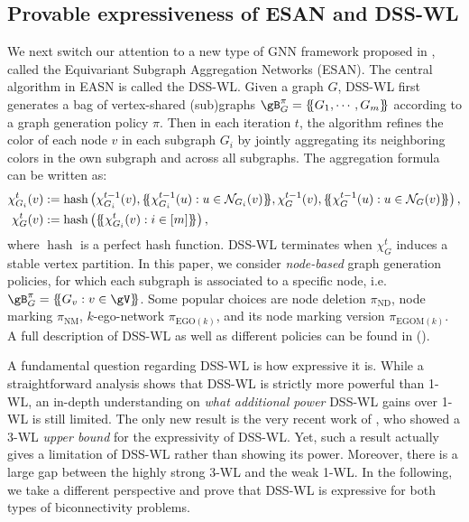 \documentclass{article}
\let\cref\crtcref
\newcommand*{\ldblbrace}{\{\mskip-5mu\{}
\newcommand*{\rdblbrace}{\}\mskip-5mu\}}
\begin{document}
\subsection{Provable expressiveness of ESAN and DSS-WL}
\label{sec:esan}
We next switch our attention to a new type of GNN framework proposed in , called the Equivariant Subgraph Aggregation Networks (ESAN). The central algorithm in EASN is called the DSS-WL. Given a graph $G$, DSS-WL first generates a bag of vertex-shared (sub)graphs $\gB^\pi_G=\ldblbrace G_1,\cdots,G_m\rdblbrace$ according to a graph generation policy $\pi$. Then in each iteration $t$, the algorithm refines the color of each node $v$ in each subgraph $G_i$ by jointly aggregating its neighboring colors in the own subgraph and across all subgraphs. The aggregation formula can be written as:
\begin{align}
\label{eq:dsswl_aggregation}
    \chi_{G_i}^t(v)&:= \operatorname{hash}\left(\chi_{G_i}^{t-1}(v),\ldblbrace \chi_{G_i}^{t-1}(u):u\in \mathcal N_{G_i}(v) \rdblbrace,\chi_{G}^{t-1}(v),\ldblbrace \chi_{G}^{t-1}(u):u\in \mathcal N_G(v) \rdblbrace\right),\\
    \chi_G^t(v)&:= \operatorname{hash}\left(\ldblbrace \chi_{G_i}^{t}(v):i\in [m]\rdblbrace\right),
\end{align}
where $\operatorname{hash}$ is a perfect hash function. DSS-WL terminates when $\chi_G^t$ induces a stable vertex partition. In this paper, we consider \emph{node-based} graph generation policies, for which each subgraph is associated to a specific node, i.e. $\gB^\pi_G=\ldblbrace G_v:v\in\gV\rdblbrace$. Some popular choices are node deletion $\pi_\mathrm{ND}$, node marking $\pi_\mathrm{NM}$, $k$-ego-network $\pi_{\mathrm{EGO}(k)}$, and its node marking version $\pi_{\mathrm{EGOM}(k)}$. A full description of DSS-WL as well as different policies can be found in \cref{sec:dsswl} (\cref{alg:dsswl}).

A fundamental question regarding DSS-WL is how expressive it is. While a straightforward analysis shows that DSS-WL is strictly more powerful than 1-WL, an in-depth understanding on \emph{what additional power} DSS-WL gains over 1-WL is still limited. The only new result is the very recent work of , who showed a 3-WL \emph{upper bound} for the expressivity of DSS-WL. Yet, such a result actually gives a limitation of DSS-WL rather than showing its power. Moreover, there is a large gap between the highly strong 3-WL and the weak 1-WL. In the following, we take a different perspective and prove that DSS-WL is expressive for both types of biconnectivity problems.
\end{document}
